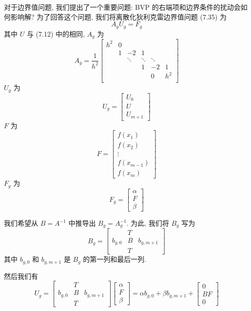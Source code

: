 \documentclass[a4paper]{ctexart}
\begin{document}
{对于边界值问题, 我们提出了一个重要问题: BVP 的右端项和边界条件的扰动会如何影响解? 
为了回答这个问题, 我们将离散化狄利克雷边界值问题 (7.35) 为
$$
A_g U_g = F_g
$$
其中 $U$ 与 (7.12) 中的相同, $A_g$ 为
$$
A_g = \frac{1}{h^2} \begin{bmatrix}
h^2 & 0 &   &  & & \\
&1 & -2 & 1 & &  \\
  &  &\ddots & \ddots & \ddots & \\
 &&  & 1 & -2 & 1 \\
 &&  &   &  0  & h^2 \\
\end{bmatrix}
$$
$U_g$ 为
$$
U_g = \begin{bmatrix}
U_0 \\
U \\
U_{m+1}
\end{bmatrix}
$$
$F$ 为
$$
F = \begin{bmatrix}
f(x_1) \\
f(x_2) \\
\vdots \\
f(x_{m-1}) \\
f(x_m)
\end{bmatrix}
$$
$F_g$ 为
$$
F_g = \begin{bmatrix}
\alpha \\
F \\
\beta
\end{bmatrix}
$$

我们希望从 \(B = A^{-1}\) 中推导出 \(B_g = A_g^{-1}\). 为此, 我们将 \(B_g\) 写为
$$
B_g = 
\begin{bmatrix}
 & T \\
b_{g,0} & B & b_{g,m+1} \\
 & T
\end{bmatrix}
$$
其中 \(b_{g,0}\) 和 \(b_{g,m+1}\) 是 \(B_g\) 的第一列和最后一列.

然后我们有
$$ U_g = 
\begin{bmatrix}
 & T \\
b_{g,0} & B & b_{g,m+1} \\
 & T
\end{bmatrix}
\begin{bmatrix}
\alpha \\
F \\
\beta
\end{bmatrix}
= \alpha b_{g,0} + \beta b_{g,m+1} + \begin{bmatrix}
0 \\
BF \\
0
\end{bmatrix}
$$

}
\end{document}

